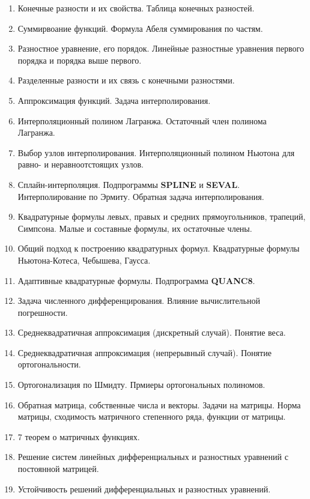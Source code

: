 \documentclass[../../calc-math-exam-2023.tex]{subfiles}
\begin{document}
    \begin{enumerate}
        \item Конечные разности и их свойства. Таблица конечных разностей.
        \item Суммирвоание функций. Формула Абеля суммирования по частям.
        \item Разностное уравнение, его порядок. Линейные разностные уравнения первого порядка и порядка выше первого.
        \item Разделенные разности и их связь с конечными разностями.
        \item Аппроксимация функций. Задача интерполирования.
        \item Интерполяционный полином Лагранжа. Остаточный член полинома Лагранжа.
        \item Выбор узлов интерполирования. Интерполяционный полином Ньютона для равно- и неравноотстоящих узлов.
        \item Сплайн-интерполяция. Подпрограммы \textbf{SPLINE} и \textbf{SEVAL}. Интерполирование по Эрмиту. Обратная задача интерполирования.
        \item Квадратурные формулы левых, правых и средних прямоугольников, трапеций, Симпсона. Малые и составные формулы, их остаточные члены.
        \item Общий подход к построению квадратурных формул. Квадратурные формулы Ньютона-Котеса, Чебышева, Гаусса.
        \item Адаптивные квадратурные формулы. Подпрограмма \textbf{QUANC8}.
        \item Задача численного дифференцирования. Влияние вычислительной погрешности.
        \item Среднеквадратичная аппроксимация (дискретный случай). Понятие веса.
        \item Среднеквадратичная аппроксимация (непрерывный случай). Понятие ортогональности.
        \item Ортогонализация по Шмидту. Прмиеры ортогональных полиномов.
        \item Обратная матрица, собственные числа и векторы. Задачи на матрицы. Норма матрицы, сходимость матричного степенного ряда, функции от матрицы.
        \item 7 теорем о матричных функциях.
        \item Решение систем линейных дифференциальных и разностных уравнений с постоянной матрицей.
        \item Устойчивость решений дифференциальных и разностных уравнений.

\end{enumerate}
\end{document}
